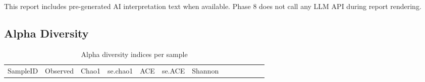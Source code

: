 \documentclass[
  letterpaper,
  DIV=11,
  numbers=noendperiod]{scrartcl}
\begin{document}
This report includes pre-generated AI interpretation text when
available. Phase 8 does not call any LLM API during report rendering.

\subsection{Alpha Diversity}\label{alpha-diversity}

\begin{longtable}[]{@{}
  >{\raggedright\arraybackslash}p{}
  >{\raggedleft\arraybackslash}p{}
  >{\raggedleft\arraybackslash}p{}
  >{\raggedleft\arraybackslash}p{}
  >{\raggedleft\arraybackslash}p{}
  >{\raggedleft\arraybackslash}p{}
  >{\raggedleft\arraybackslash}p{}
  >{\raggedleft\arraybackslash}p{}
  >{\raggedleft\arraybackslash}p{}
  >{\raggedleft\arraybackslash}p{}
  >{\raggedleft\arraybackslash}p{}
  >{\raggedleft\arraybackslash}p{}
  >{\raggedright\arraybackslash}p{}@{}}
\caption{Alpha diversity indices per sample}\tabularnewline
\toprule\noalign{}
\begin{minipage}[b]{\linewidth}\raggedright
SampleID
\end{minipage} & \begin{minipage}[b]{\linewidth}\raggedleft
Observed
\end{minipage} & \begin{minipage}[b]{\linewidth}\raggedleft
Chao1
\end{minipage} & \begin{minipage}[b]{\linewidth}\raggedleft
se.chao1
\end{minipage} & \begin{minipage}[b]{\linewidth}\raggedleft
ACE
\end{minipage} & \begin{minipage}[b]{\linewidth}\raggedleft
se.ACE
\end{minipage} & \begin{minipage}[b]{\linewidth}\raggedleft
Shannon
\end{minipage} & \begin{minipage}[b]{\linewidth}\raggedleft

\end{minipage}
\end{longtable}
\end{document}

